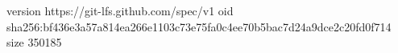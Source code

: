 version https://git-lfs.github.com/spec/v1
oid sha256:bf436e3a57a814ea266e1103c73e75fa0c4ee70b5bac7d24a9dce2c20fd0f714
size 350185
